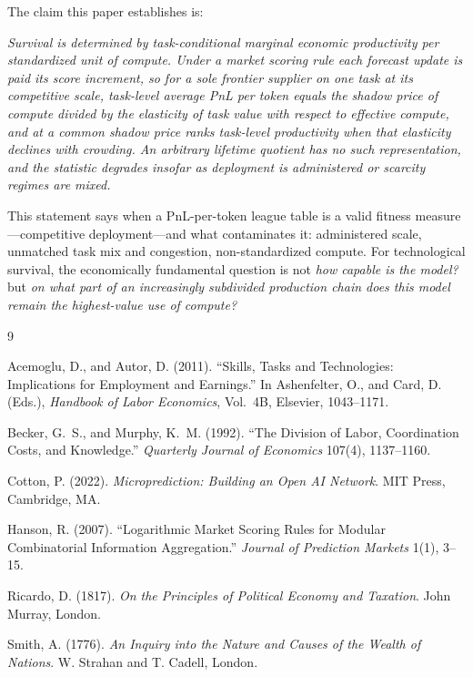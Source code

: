 \documentclass[11pt]{article}
\theoremstyle{definition}
\theoremstyle{remark}
\begin{document}
The claim this paper establishes is:
\begin{center}
\emph{Survival is determined by task-conditional marginal economic productivity per standardized unit of compute. Under a market scoring rule each forecast update is paid its score increment, so for a sole frontier supplier on one task at its competitive scale, task-level average PnL per token equals the shadow price of compute divided by the elasticity of task value with respect to effective compute, and at a common shadow price ranks task-level productivity when that elasticity declines with crowding. An arbitrary lifetime quotient has no such representation, and the statistic degrades insofar as deployment is administered or scarcity regimes are mixed.}
\end{center}
This statement says when a PnL-per-token league table is a valid fitness measure---competitive deployment---and what contaminates it: administered scale, unmatched task mix and congestion, non-standardized compute. For technological survival, the economically fundamental question is not \emph{how capable is the model?} but \emph{on what part of an increasingly subdivided production chain does this model remain the highest-value use of compute?}

\begin{thebibliography}{9}

Acemoglu, D., and Autor, D. (2011). ``Skills, Tasks and Technologies: Implications for Employment and Earnings.'' In Ashenfelter, O., and Card, D. (Eds.), \emph{Handbook of Labor Economics}, Vol.~4B, Elsevier, 1043--1171.

Becker, G.~S., and Murphy, K.~M. (1992). ``The Division of Labor, Coordination Costs, and Knowledge.'' \emph{Quarterly Journal of Economics} 107(4), 1137--1160.

Cotton, P. (2022). \emph{Microprediction: Building an Open AI Network}. MIT Press, Cambridge, MA.

Hanson, R. (2007). ``Logarithmic Market Scoring Rules for Modular Combinatorial Information Aggregation.'' \emph{Journal of Prediction Markets} 1(1), 3--15.

Ricardo, D. (1817). \emph{On the Principles of Political Economy and Taxation}. John Murray, London.

Smith, A. (1776). \emph{An Inquiry into the Nature and Causes of the Wealth of Nations}. W. Strahan and T. Cadell, London.

\end{thebibliography}
\end{document}

